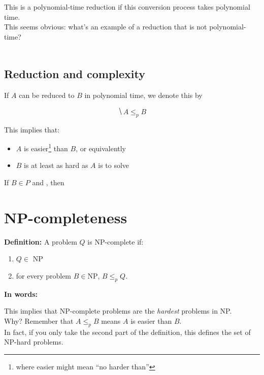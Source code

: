 \documentclass[11  pt]{article}
\begin{document}
\vfill

This is a polynomial-time reduction if this conversion process takes polynomial time. \\

This seems obvious: what's an example of a reduction that is not polynomial-time? \\ \\

\vfill

\newpage
\subsection{Reduction and complexity}

If $A$ can be reduced to $B$ in polynomial time, we denote this by 

\begin{equation*}
	\hide{A \leq_p B}
\end{equation*}

This implies that:
\begin{itemize}
	\item $A$ is easier\footnote{where easier might mean ``no harder than''} than $B$, or equivalently 
	\item $B$ is at least as hard as $A$ is to solve\\
\end{itemize} 

\begin{lemma} 
	If $B \in P$ and , then 
\end{lemma}	

\newpage


\section{NP-completeness}

\textbf{Definition: } A problem $Q$ is NP-complete if:
\begin{enumerate}
	\item $Q \in$ NP
	\item for every problem $B \in \text{NP}$, $B \leq_p Q$. \\
\end{enumerate}

\textbf{In words:} \\ %


\vs{8cm}

This implies that NP-complete problems are the \emph{hardest} problems in NP. \\


Why? Remember that $A \leq_p B$ means $A$ is easier than $B$. \\

In fact, if you only take the second part of the definition, this defines the set of NP-hard problems.
\end{document}
